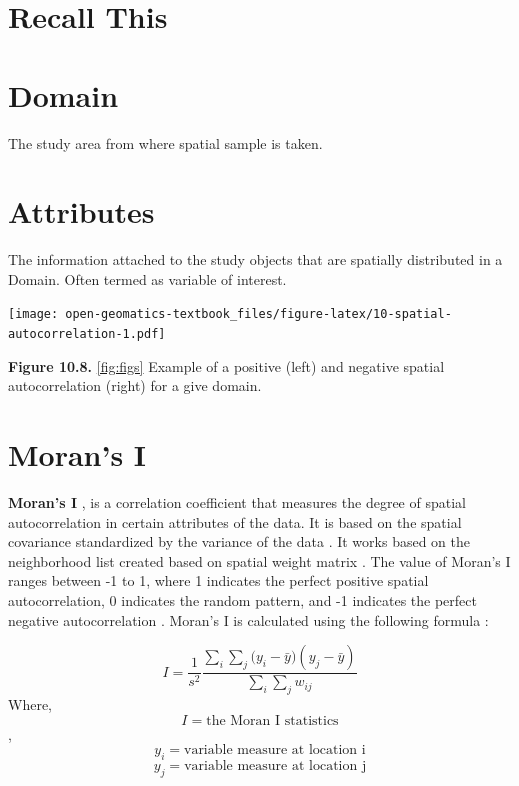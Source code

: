 \documentclass[
]{book}
\begin{document}
\hypertarget{recall-this-2}{%
\section*{Recall This}\label{recall-this-2}}

\hypertarget{domain}{%
\section{Domain}\label{domain}}

The study area from where spatial sample is taken.

\hypertarget{attributes}{%
\section{Attributes}\label{attributes}}

The information attached to the study objects that are spatially distributed in a Domain. Often termed as variable of interest.

\texttt{[image: open-geomatics-textbook\_files/figure-latex/10-spatial-autocorrelation-1.pdf]}

\textbf{Figure 10.8.} \ref{fig:figs} Example of a positive (left) and negative spatial autocorrelation (right) for a give domain.

\hypertarget{morans-i}{%
\section{Moran's I}\label{morans-i}}

\textbf{Moran's I} \citep{Moran1950}, is a correlation coefficient that measures the degree of spatial autocorrelation in certain attributes of the data. It is based on the spatial covariance standardized by the variance of the data \citep{Moran1950}. It works based on the neighborhood list created based on spatial weight matrix \citep{Suryowati2018}. The value of Moran's I ranges between -1 to 1, where 1 indicates the perfect positive spatial autocorrelation, 0 indicates the random pattern, and -1 indicates the perfect negative autocorrelation \citep{Moran1950}. Moran's I is calculated using the following formula \citep{Moran1950}:

\[
I= \frac{1}{s^2} \frac{\sum_{i}\sum_{j}({y_i-\bar{y})({y_j-\bar{y}})}}
{\sum_{i}\sum_{j}w_{ij}}
\]
Where, \[I=\text{the Moran I statistics}\], \[y_i=\text{variable measure at location i}\]
\[y_j=\text{variable measure at location j}\]
\end{document}
